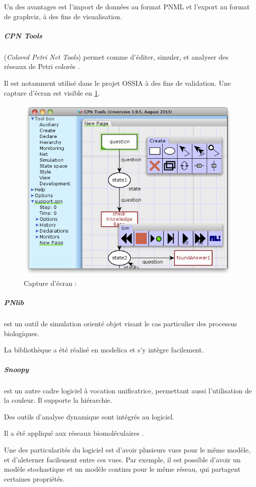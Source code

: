 Un des avantages est l'import de données au format \ac{PNML} et l'export au format  de \gls{graphviz}, à des fins de visualisation.

\subparagraph{CPN Tools} (\textit{Colored Petri Net Tools}) permet comme  d'éditer, simuler, et analyser des réseaux de Petri colorés \cite{jensen2007coloured}.

Il est notamment utilisé dans le projet \ac{OSSIA} à des fins de validation. Une capture d'écran est visible en \cref{fig.cpntools}.

\begin{figure}[H]
	\centering
	\includegraphics[scale=0.3]{images/cpntools.png}
	\caption{Capture d'écran : }
	\label{fig.cpntools}
\end{figure}

\subparagraph{PNlib} \cite{pross2014object} est un outil de simulation orienté objet visant le cas particulier des processus biologiques.

La bibliothèque a été réalisé en \gls{modelica} et s'y intègre facilement.

\subparagraph{Snoopy} \cite{heiner2012snoopy} est un autre cadre logiciel à vocation unificatrice, permettant aussi l'utilisation de la couleur. Il supporte la hiérarchie.

Des outils d'analyse dynamique sont intégrés au logiciel.

Il a été appliqué aux réseaux biomoléculaires \cite{rohr2010snoopy}.

Une des particularités du logiciel est d'avoir plusieurs vues pour le même modèle, et d'aleterner facilement entre ces vues. Par exemple, il est possible d'avoir un modèle stochastique et un modèle continu pour le même réseau, qui partagent certaines propriétés.

